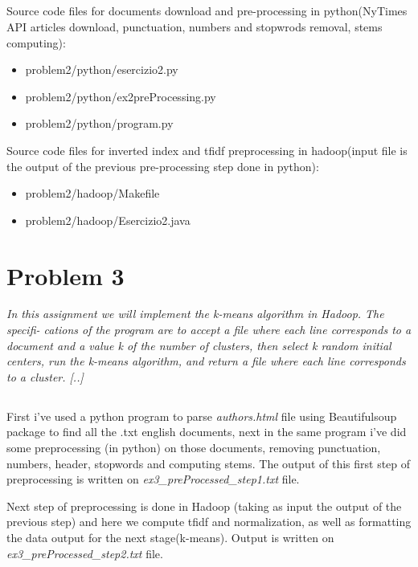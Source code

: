\documentclass{article}
\begin{document}
\subsection{}

Source code files for documents download and pre-processing in python(NyTimes API articles download, punctuation, numbers and stopwrods removal, stems computing):
\begin {itemize}
    \item problem2/python/esercizio2.py
    \item problem2/python/ex2preProcessing.py
    \item problem2/python/program.py  
\end {itemize}


Source code files for inverted index and tfidf preprocessing in hadoop(input file is the output of the previous pre-processing step done in python):
\begin {itemize}
    \item problem2/hadoop/Makefile
    \item problem2/hadoop/Esercizio2.java
\end {itemize}









\section{Problem 3}
\textit{In this assignment we will implement the k-means algorithm in Hadoop. The specifi- cations of the program are to accept a file where each line corresponds to a document and a value k of the number of clusters, then select k random initial centers, run the k-means algorithm, and return a file where each line corresponds to a cluster. [..]}

\subsection{}
First i've used a python program to parse \textit{authors.html} file using Beautifulsoup package to find all the .txt english documents, next in the same program i've did some preprocessing (in python) on those documents, removing punctuation, numbers, header, stopwords and computing stems. The output of this first step of preprocessing is written on \textit{ex3\_preProcessed\_step1.txt} file.

Next step of preprocessing is done in Hadoop (taking as input the output of the previous step) and here we compute tfidf and normalization, as well as formatting the data output for the next stage(k-means). Output is written on \textit{ex3\_preProcessed\_step2.txt} file.
\end{document}
